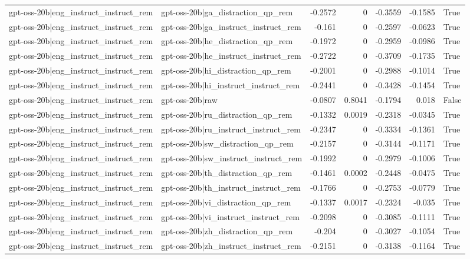 \begin{table}
\begin{tabular}{l l r r r r l}
gpt-oss-20b|eng_instruct_instruct_rem & gpt-oss-20b|ga_distraction_qp_rem & -0.2572 & 0 & -0.3559 & -0.1585 & True \\
gpt-oss-20b|eng_instruct_instruct_rem & gpt-oss-20b|ga_instruct_instruct_rem & -0.161 & 0 & -0.2597 & -0.0623 & True \\
gpt-oss-20b|eng_instruct_instruct_rem & gpt-oss-20b|he_distraction_qp_rem & -0.1972 & 0 & -0.2959 & -0.0986 & True \\
gpt-oss-20b|eng_instruct_instruct_rem & gpt-oss-20b|he_instruct_instruct_rem & -0.2722 & 0 & -0.3709 & -0.1735 & True \\
gpt-oss-20b|eng_instruct_instruct_rem & gpt-oss-20b|hi_distraction_qp_rem & -0.2001 & 0 & -0.2988 & -0.1014 & True \\
gpt-oss-20b|eng_instruct_instruct_rem & gpt-oss-20b|hi_instruct_instruct_rem & -0.2441 & 0 & -0.3428 & -0.1454 & True \\
gpt-oss-20b|eng_instruct_instruct_rem & gpt-oss-20b|raw & -0.0807 & 0.8041 & -0.1794 & 0.018 & False \\
gpt-oss-20b|eng_instruct_instruct_rem & gpt-oss-20b|ru_distraction_qp_rem & -0.1332 & 0.0019 & -0.2318 & -0.0345 & True \\
gpt-oss-20b|eng_instruct_instruct_rem & gpt-oss-20b|ru_instruct_instruct_rem & -0.2347 & 0 & -0.3334 & -0.1361 & True \\
gpt-oss-20b|eng_instruct_instruct_rem & gpt-oss-20b|sw_distraction_qp_rem & -0.2157 & 0 & -0.3144 & -0.1171 & True \\
gpt-oss-20b|eng_instruct_instruct_rem & gpt-oss-20b|sw_instruct_instruct_rem & -0.1992 & 0 & -0.2979 & -0.1006 & True \\
gpt-oss-20b|eng_instruct_instruct_rem & gpt-oss-20b|th_distraction_qp_rem & -0.1461 & 0.0002 & -0.2448 & -0.0475 & True \\
gpt-oss-20b|eng_instruct_instruct_rem & gpt-oss-20b|th_instruct_instruct_rem & -0.1766 & 0 & -0.2753 & -0.0779 & True \\
gpt-oss-20b|eng_instruct_instruct_rem & gpt-oss-20b|vi_distraction_qp_rem & -0.1337 & 0.0017 & -0.2324 & -0.035 & True \\
gpt-oss-20b|eng_instruct_instruct_rem & gpt-oss-20b|vi_instruct_instruct_rem & -0.2098 & 0 & -0.3085 & -0.1111 & True \\
gpt-oss-20b|eng_instruct_instruct_rem & gpt-oss-20b|zh_distraction_qp_rem & -0.204 & 0 & -0.3027 & -0.1054 & True \\
gpt-oss-20b|eng_instruct_instruct_rem & gpt-oss-20b|zh_instruct_instruct_rem & -0.2151 & 0 & -0.3138 & -0.1164 & True \\

\end{tabular}
\end{table}
